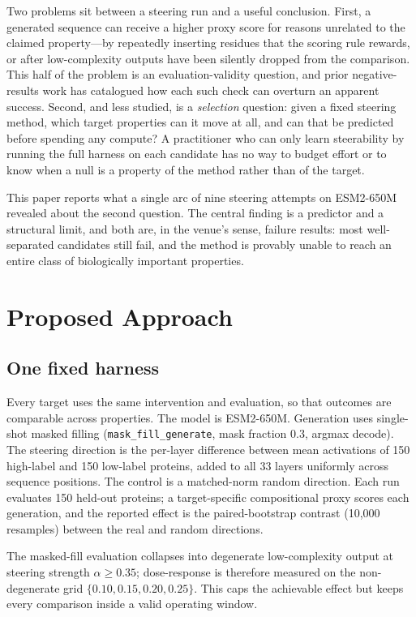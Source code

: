 \documentclass{article}
\begin{document}
Two problems sit between a steering run and a useful conclusion. First, a
generated sequence can receive a higher proxy score for reasons unrelated to
the claimed property---by repeatedly inserting residues that the scoring rule
rewards, or after low-complexity outputs have been silently dropped from the
comparison. This half of the problem is an evaluation-validity question, and
prior negative-results work has catalogued how each such check can overturn an
apparent success. Second, and less studied, is a \emph{selection} question:
given a fixed steering method, which target properties can it move at all, and
can that be predicted before spending any compute? A practitioner who can only
learn steerability by running the full harness on each candidate has no way to
budget effort or to know when a null is a property of the method rather than of
the target.

This paper reports what a single arc of nine steering attempts on ESM2-650M
revealed about the second question. The central finding is a predictor and a
structural limit, and both are, in the venue's sense, failure results: most
well-separated candidates still fail, and the method is provably unable to
reach an entire class of biologically important properties.

\section{Proposed Approach}
\label{sec:approach}

\subsection{One fixed harness}

Every target uses the same intervention and evaluation, so that outcomes are
comparable across properties. The model is ESM2-650M. Generation uses
single-shot masked filling (\texttt{mask\_fill\_generate}, mask fraction
$0.3$, argmax decode). The steering direction is the per-layer difference
between mean activations of 150 high-label and 150 low-label proteins, added to
all 33 layers uniformly across sequence positions. The control is a
matched-norm random direction. Each run evaluates 150 held-out proteins; a
target-specific compositional proxy scores each generation, and the reported
effect is the paired-bootstrap contrast (10,000 resamples) between the real and
random directions.

The masked-fill evaluation collapses into degenerate low-complexity output at
steering strength $\alpha\!\ge\!0.35$; dose-response is therefore measured on
the non-degenerate grid $\{0.10, 0.15, 0.20, 0.25\}$. This caps the achievable
effect but keeps every comparison inside a valid operating window.
\end{document}
